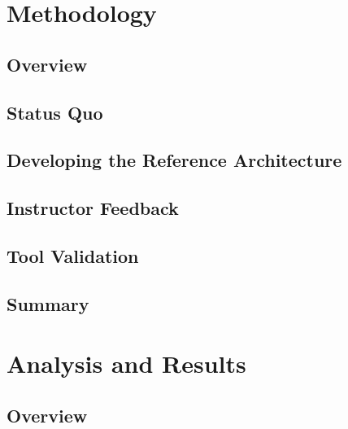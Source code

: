 \documentclass[12pt,letterpaper,oneside]{book}
\begin{document}
    \chapter{Methodology}
    \label{Methodology}

    	\section{Overview}
        \label{MethOverview}
        
        
    	\section{Status Quo}
        \label{StatusQuo}
        

    	\section{Developing the Reference Architecture}
        \label{Development}
        
        
    	\section{Instructor Feedback}
        \label{InstFeedback}
        
        
    	\section{Tool Validation}
        \label{ToolValidation}
        
        
        \section{Summary}
        \label{Ch3Sum}
   		
        
    \chapter{Analysis and Results}
    \label{analysisandresults}
    	\section{Overview}
        \label{subanalysisandresults}
        
\end{document}
